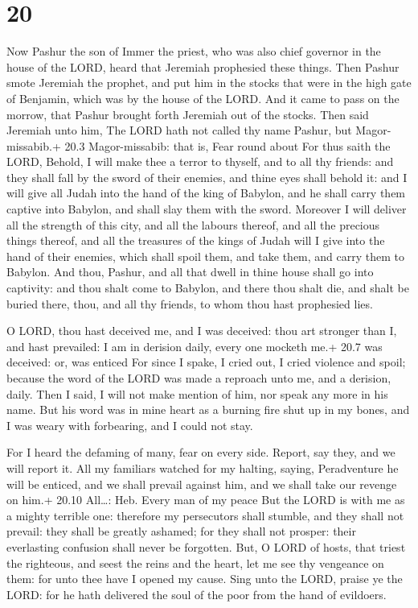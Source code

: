 \hypertarget{section-19}{%
\section{20}\label{section-19}}

 Now Pashur the son of Immer the priest, who was also chief
governor in the house of the LORD, heard that Jeremiah prophesied these
things.  Then Pashur smote Jeremiah the prophet, and put him
in the stocks that were in the high gate of Benjamin, which was by the
house of the LORD.  And it came to pass on the morrow, that
Pashur brought forth Jeremiah out of the stocks. Then said Jeremiah unto
him, The LORD hath not called thy name Pashur, but Magor-missabib.+ 20.3
Magor-missabib: that is, Fear round about  For thus saith
the LORD, Behold, I will make thee a terror to thyself, and to all thy
friends: and they shall fall by the sword of their enemies, and thine
eyes shall behold it: and I will give all Judah into the hand of the
king of Babylon, and he shall carry them captive into Babylon, and shall
slay them with the sword.  Moreover I will deliver all the
strength of this city, and all the labours thereof, and all the precious
things thereof, and all the treasures of the kings of Judah will I give
into the hand of their enemies, which shall spoil them, and take them,
and carry them to Babylon.  And thou, Pashur, and all that
dwell in thine house shall go into captivity: and thou shalt come to
Babylon, and there thou shalt die, and shalt be buried there, thou, and
all thy friends, to whom thou hast prophesied lies.

 O LORD, thou hast deceived me, and I was deceived: thou
art stronger than I, and hast prevailed: I am in derision daily, every
one mocketh me.+ 20.7 was deceived: or, was enticed  For
since I spake, I cried out, I cried violence and spoil; because the word
of the LORD was made a reproach unto me, and a derision, daily.
 Then I said, I will not make mention of him, nor speak any
more in his name. But his word was in mine heart as a burning fire shut
up in my bones, and I was weary with forbearing, and I could not stay.

 For I heard the defaming of many, fear on every side.
Report, say they, and we will report it. All my familiars watched for my
halting, saying, Peradventure he will be enticed, and we shall prevail
against him, and we shall take our revenge on him.+ 20.10 All\ldots:
Heb. Every man of my peace  But the LORD is with me as a
mighty terrible one: therefore my persecutors shall stumble, and they
shall not prevail: they shall be greatly ashamed; for they shall not
prosper: their everlasting confusion shall never be forgotten.
 But, O LORD of hosts, that triest the righteous, and seest
the reins and the heart, let me see thy vengeance on them: for unto thee
have I opened my cause.  Sing unto the LORD, praise ye the
LORD: for he hath delivered the soul of the poor from the hand of
evildoers.

